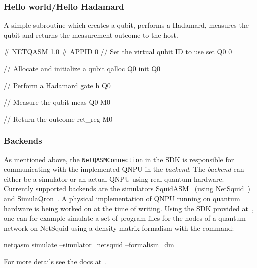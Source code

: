 \subsubsection{Hello world/Hello Hadamard}\label{netqasm:sec:example_nq_hello_world}
A simple subroutine which creates a qubit, performs a Hadamard, measures the qubit and returns the measurement outcome to the host.
\begin{nqcode}
  # NETQASM 1.0
  # APPID 0
  // Set the virtual qubit ID to use
  set Q0 0

  // Allocate and initialize a qubit
  qalloc Q0
  init Q0

  // Perform a Hadamard gate
  h Q0

  // Measure the qubit
  meas Q0 M0

  // Return the outcome
  ret_reg M0
\end{nqcode}

\subsubsection{Backends}
\label{netqasm:sec:backends}
As mentioned above, the \texttt{NetQASMConnection} in the SDK is responsible for communicating with the implemented \ac{QNPU} in the \emph{backend}.
The \emph{backend} can either be a simulator or an actual \ac{QNPU} using real quantum hardware.
Currently supported backends are the simulators SquidASM~\cite{git_squidasm} (using NetSquid~\cite{netsquid, coopmans2021netsquid}) and SimulaQron~\cite{dahlberg2018simulaqron}.
A physical implementation of \ac{QNPU} running on quantum hardware is being worked on at the time of writing.
Using the SDK provided at~\cite{git_netqasm}, one can for example simulate a set of program files for the nodes of a quantum network on NetSquid using a density matrix formalism with the command:
\begin{nqcode}
  netqasm simulate --simulator=netsquid --formalism=dm
\end{nqcode}
For more details see the docs at~\cite{git_netqasm}.